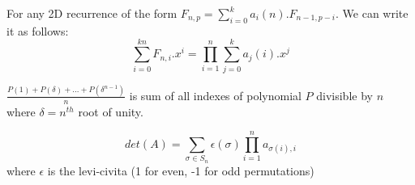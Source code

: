 

 For any 2D recurrence of the form $F_{n,p} = \sum_{i=0}^{k}a_{i}(n).F_{n-1,p-i}$. We can write it as follows:
$$\sum_{i=0}^{kn}F_{n,i}.x^{i} = \prod_{i=1}^{n} \sum_{j=0}^{k}a_{j}(i).x^{j}$$

 $\frac{P(1)+P(\delta)+...+P(\delta^{n-1})}{n}$ is sum of all indexes of polynomial $P$ divisible by $n$ where $\delta = n^{th}$ root of unity.

 $$det(A) = \sum_{\sigma \in S_{n}} \epsilon(\sigma) \prod_{i=1}^{n}a_{\sigma(i),i}$$ where $\epsilon$ is the levi-civita (1 for even, -1 for odd permutations)

